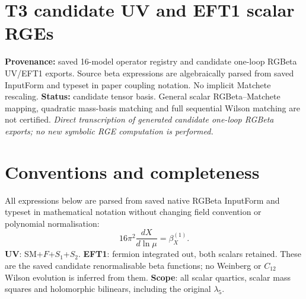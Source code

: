 \documentclass[9pt,a4paper]{article}
\begin{document}
\section*{T3 candidate UV and EFT1 scalar RGEs}
\textbf{Provenance:} saved 16-model operator registry and candidate one-loop RGBeta UV/EFT1 exports. Source beta expressions are algebraically parsed from saved InputForm and typeset in paper coupling notation. No implicit Matchete rescaling.
\textbf{Status:} candidate tensor basis. General scalar RGBeta--Matchete mapping, quadratic mass-basis matching and full sequential Wilson matching are not certified.
\textit{Direct transcription of generated candidate one-loop RGBeta exports; no new symbolic RGE computation is performed.}
\bigskip
\section*{Conventions and completeness}
All expressions below are parsed from saved native RGBeta InputForm and typeset in mathematical notation without changing field convention or polynomial normalisation:
\[16\pi^2\frac{d X}{d\ln\mu}=\beta_X^{(1)}.\]
\textbf{UV}: SM+$F$+$S_1$+$S_2$. \textbf{EFT1}: fermion integrated out, both scalars retained. These are the saved candidate renormalisable beta functions; no Weinberg or $C_{12}$ Wilson evolution is inferred from them.
\textbf{Scope}: all scalar quartics, scalar mass squares and holomorphic bilinears, including the original $\lambda_5$.
\end{document}
